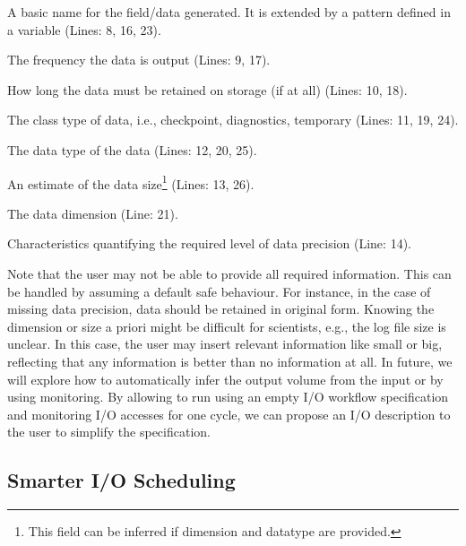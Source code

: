 \documentclass{superfri}
\begin{document}
\begin{description}[itemsep=0pt]
  \item[Name] A basic name for the field/data generated. It is extended by a pattern defined in a variable (Lines: 8, 16, 23).

  \item[Pattern] The frequency the data is output (Lines: 9, 17).

  \item[Lifetime] How long the data must be retained on storage (if at all) (Lines: 10, 18).

  \item[Type] The class type of data, i.e., checkpoint, diagnostics, temporary (Lines: 11, 19, 24).

  \item[Datatype] The data type of the data (Lines: 12, 20, 25).

  \item[Size] An estimate of the data size\footnote{This field can be inferred if dimension and datatype are provided.} (Lines: 13, 26).

  \item[Dimension] The data dimension (Line: 21).

  \item[Accuracy] Characteristics quantifying the required level of data precision (Line: 14).

\end{description}

Note that the user may not be able to provide all required information.
This can be handled by assuming a default safe behaviour.
For instance, in the case of missing data precision, data should be retained in original form.
Knowing the dimension or size a priori might be difficult for scientists, e.g., the log file size is unclear.
In this case, the user may insert relevant information like small or big, reflecting that any information is better than no information at all.
In future, we will explore how to automatically infer the output volume from the input or by using monitoring.
By allowing to run using an empty I/O workflow specification and monitoring I/O accesses for one cycle, we can propose an I/O description to the user to simplify the specification.

\subsection{Smarter I/O Scheduling}
\end{document}

